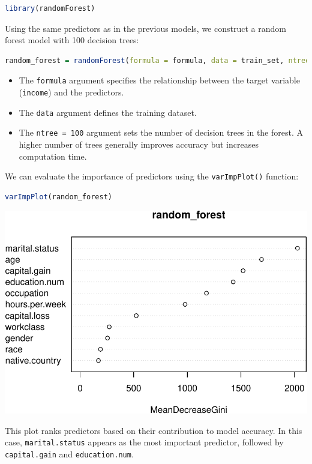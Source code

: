 \documentclass[
]{book}
\newcommand{\passthrough}[1]{#1}
\providecommand{\tightlist}{%
  \setlength{\itemsep}{0pt}\setlength{\parskip}{0pt}}
\theoremstyle{definition}
\theoremstyle{definition}
\theoremstyle{definition}
\theoremstyle{definition}
\theoremstyle{remark}
\begin{document}
\begin{lstlisting}[language=R]
library(randomForest)
\end{lstlisting}

Using the same predictors as in the previous models, we construct a random forest model with 100 decision trees:

\begin{lstlisting}[language=R]
random_forest = randomForest(formula = formula, data = train_set, ntree = 100)
\end{lstlisting}

\begin{itemize}
\tightlist
\item
  The \passthrough{\lstinline!formula!} argument specifies the relationship between the target variable (\passthrough{\lstinline!income!}) and the predictors.\\
\item
  The \passthrough{\lstinline!data!} argument defines the training dataset.\\
\item
  The \passthrough{\lstinline!ntree = 100!} argument sets the number of decision trees in the forest. A higher number of trees generally improves accuracy but increases computation time.
\end{itemize}

We can evaluate the importance of predictors using the \passthrough{\lstinline!varImpPlot()!} function:

\begin{lstlisting}[language=R]
varImpPlot(random_forest)
\end{lstlisting}

\begin{center}\includegraphics[width=0.7\linewidth]{tree_files/figure-latex/unnamed-chunk-19-1} \end{center}

This plot ranks predictors based on their contribution to model accuracy. In this case, \passthrough{\lstinline!marital.status!} appears as the most important predictor, followed by \passthrough{\lstinline!capital.gain!} and \passthrough{\lstinline!education.num!}.
\end{document}
